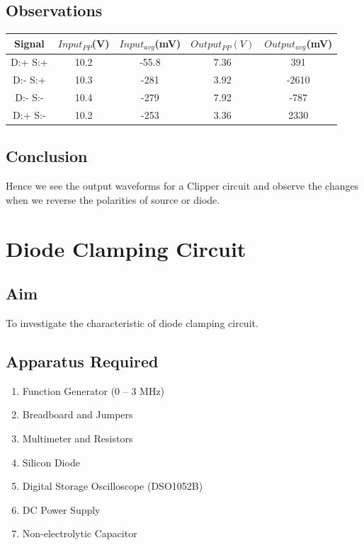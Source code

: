 \documentclass{article}
\begin{document}
\subsection{Observations}
\begin{center}
\begin{tabular}{|c|c|c|c|c|}
\hline
    Signal & $Input_{PP}$(V) & $Input_{avg}$(mV) & $Output_{PP}(V)$ & $Output_{avg}$(mV) \\
    \hline
    D:+ S:+ & 10.2 & -55.8 & 7.36 & 391\\
    D:- S:+ & 10.3 & -281 & 3.92 & -2610 \\
    D:- S:- & 10.4 & -279 & 7.92 & -787\\
    D:+ S:- & 10.2 & -253 & 3.36 & 2330\\
\hline
\end{tabular}
\end{center}
\subsection{Conclusion}
Hence we see the output waveforms for a Clipper circuit and observe the changes when we reverse the polarities of source or diode.
\newpage
\section{Diode Clamping Circuit}
\subsection{Aim}
To investigate the characteristic of diode clamping circuit.
\subsection{Apparatus Required}
\begin{enumerate}
    \item Function Generator (0 – 3 MHz)
    \item Breadboard and Jumpers
    \item Multimeter and Resistors
    \item Silicon Diode
    \item Digital Storage Oscilloscope (DSO1052B)
    \item DC Power Supply
    \item Non-electrolytic Capacitor
\end{enumerate}
\end{document}
